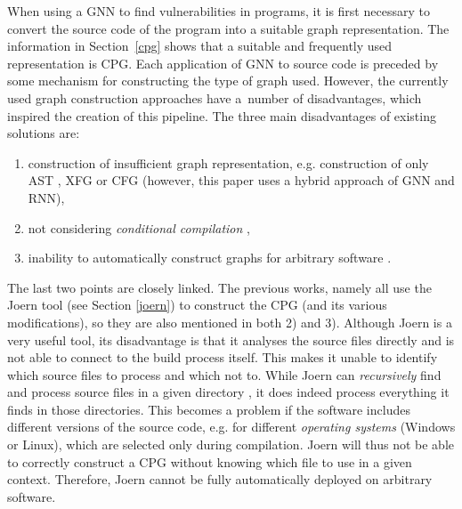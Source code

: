 When using a GNN to find vulnerabilities in programs, it is first necessary to convert the source code of the program into a suitable graph representation. The information in Section~\ref{cpg} shows that a suitable and frequently used representation is CPG. Each application of GNN to source code is preceded by some mechanism for constructing the type of graph used. However, the currently used graph construction approaches have a~number of disadvantages, which inspired the creation of this pipeline. The three main disadvantages of existing solutions are:

\begin{enumerate}
    \item construction of insufficient graph representation, e.g. construction of only AST \cite{GNN5-vsikic2022graph}, XFG \cite{GNN3-cheng2021deepwukong} or CFG \cite{GNN7-RNN-rabheru2020hybrid} (however, this paper uses a hybrid approach of GNN and RNN),
    \item not considering \textit{conditional compilation} \cite{GNN1-cao2021bgnn4vd, JOERN-CPG-guan2020code, GNN4-IBM-suneja2020learning, JOERN-CPG-xiaomeng2018cpgva, GNN2-zhou2019devign},
    \item inability to automatically construct graphs for arbitrary software \cite{GNN1-cao2021bgnn4vd, JOERN-CPG-guan2020code, GNN4-IBM-suneja2020learning, JOERN-CPG-xiaomeng2018cpgva, GNN2-zhou2019devign}.
\end{enumerate}

The last two points are closely linked. The previous works, namely \cite{GNN1-cao2021bgnn4vd, JOERN-CPG-guan2020code, GNN4-IBM-suneja2020learning, JOERN-CPG-xiaomeng2018cpgva, GNN2-zhou2019devign} all use the Joern tool (see Section \ref{joern}) to construct the CPG (and its various modifications), so they are also mentioned in both 2) and 3). Although Joern is a very useful tool, its disadvantage is that it analyses the source files directly and is not able to connect to the build process itself. This makes it unable to identify which source files to process and which not to. While Joern can \textit{recursively} find and process source files in a given directory \cite{joern-doc}, it does indeed process everything it finds in those directories. This becomes a problem if the software includes different versions of the source code, e.g. for different \textit{operating systems} (Windows or Linux), which are selected only during compilation. Joern will thus not be able to correctly construct a CPG without knowing which file to use in a given context. Therefore, Joern cannot be fully automatically deployed on arbitrary software. 

